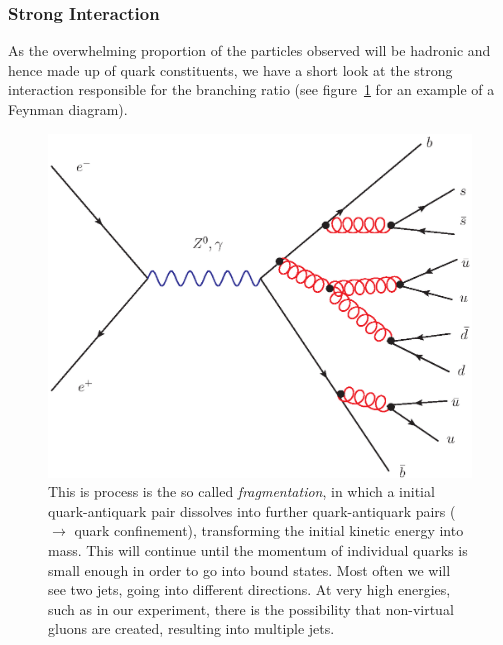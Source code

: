 \subsubsection{Strong Interaction}
\label{sub:strong}
As the overwhelming proportion of the particles observed will be hadronic and hence made up of quark constituents, 
we have a short look at the strong interaction responsible for the branching ratio (see figure~\ref{fig:hadrons} 
for an example of a Feynman diagram).
\begin{figure}[htpb]
    \centering
    \includegraphics[width=0.8\linewidth]{figures/hadrons}
    \caption{This is process is the so called \textit{fragmentation}, in which a initial quark-antiquark pair dissolves into
further quark-antiquark pairs ($\rightarrow$ quark confinement), transforming the initial kinetic energy into mass. This will
continue until the momentum of individual quarks is small enough in order to go into bound states. Most often we will see two
jets, going into different directions. At very high energies, such as in our experiment, there is the possibility that
non-virtual gluons are created, resulting into multiple jets.\cite{griffiths2008introduction}}
    \label{fig:hadrons}
\end{figure}

